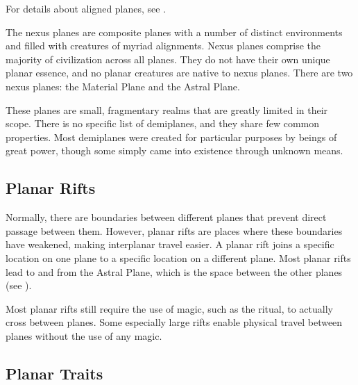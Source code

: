         For details about aligned planes, see .

         The nexus planes are composite planes with a number of distinct environments and filled with creatures of myriad alignments.
        Nexus planes comprise the majority of civilization across all planes.
        They do not have their own unique planar essence, and no planar creatures are native to nexus planes.
        There are two nexus planes: the Material Plane and the Astral Plane.

         These planes are small, fragmentary realms that are greatly limited in their scope.
        There is no specific list of demiplanes, and they share few common properties.
        Most demiplanes were created for particular purposes by beings of great power, though some simply came into existence through unknown means.

    \subsection{Planar Rifts}\label{Planar Rifts}
        Normally, there are boundaries between different planes that prevent direct passage between them.
        However, planar rifts are places where these boundaries have weakened, making interplanar travel easier.
        A planar rift joins a specific location on one plane to a specific location on a different plane.
        Most planar rifts lead to and from the Astral Plane, which is the space between the other planes (see ).

        Most planar rifts still require the use of magic, such as the  ritual, to actually cross between planes.
        Some especially large rifts enable physical travel between planes without the use of any magic.

    \subsection{Planar Traits}
